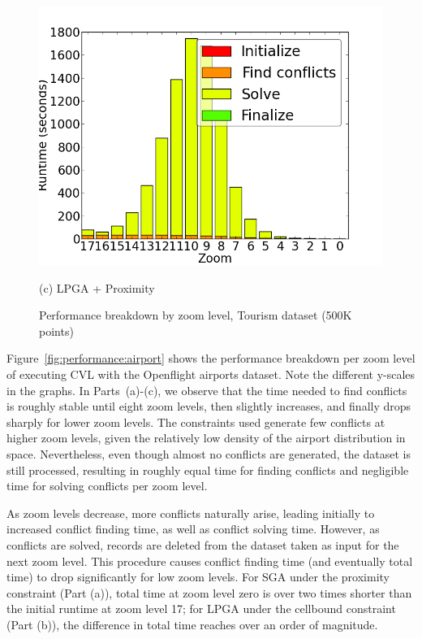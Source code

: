 \begin{figure}[tb]
\begin{minipage}{0.329\linewidth}
    \centerline{\includegraphics[width=1.0\linewidth]{./figs/prelim_pnt_500k_tourism_lp_B.png}}
    \centerline{(c) LPGA + Proximity}
  \end{minipage}
  \vspace{-0ex}
  \caption{Performance breakdown by zoom level, Tourism dataset (500K points)} \label{fig:performance:tourism}
  \vspace{-2ex}
\end{figure}


 Figure~\ref{fig:performance:airport} shows the performance breakdown per zoom level of executing CVL with the Openflight airports dataset. Note the different y-scales in the graphs. In Parts~(a)-(c), we observe that the time needed to find conflicts is roughly stable until eight zoom levels, then slightly increases, and finally drops sharply for lower zoom levels. The constraints used generate few conflicts at higher zoom levels, given the relatively low density of the airport distribution in space. Nevertheless, even though almost no conflicts are generated, the dataset is still processed, resulting in roughly equal time for finding conflicts and negligible time for solving conflicts per zoom level. 
 
As zoom levels decrease, more conflicts naturally arise, leading initially to increased conflict finding time, as well as conflict solving time. However, as conflicts are solved, records are deleted from the dataset taken as input for the next zoom level. This procedure causes conflict finding time (and eventually total time) to drop significantly for low zoom levels. For SGA under the proximity constraint (Part (a)), total time at zoom level zero is over two times shorter than the initial runtime at zoom level 17; for LPGA under the cellbound constraint (Part (b)), the difference in total time reaches over an order of magnitude.  

